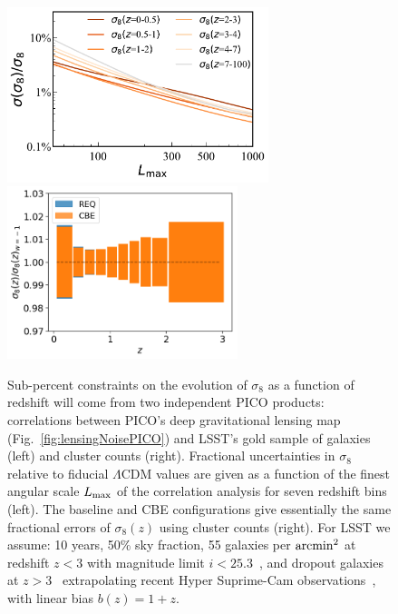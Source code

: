 \documentclass[PICOAPC.tex]{subfiles}
\begin{document}
\begin{figure}
\centering
\hspace{-0.15in}
\includegraphics[width=3in]{images/PICO_s8_lmax_PICOv4.1b_deproj0_SENS0_LSST10yrGold.pdf}
\hspace{-0.1in}
\includegraphics[width=2.65in,trim= 0cm -0.25cm 0cm 0cm]{images/PICOs8.png}
\vspace{-0.14in}
\caption{\captiontext  
Sub-percent constraints on the evolution of $\sigma_{8}$ as a function of redshift will come from two independent PICO products: correlations between PICO's deep gravitational lensing map (Fig.~\ref{fig:lensingNoisePICO}) and LSST's gold sample of galaxies (left) and cluster counts (right). Fractional uncertainties in $\sigma_{8}$ relative to fiducial $\Lambda$CDM values are given as a function of the finest angular scale $L_{\rm max}$ of the correlation analysis for seven redshift bins (left).  The baseline and CBE configurations give essentially the same fractional errors of $\sigma_{8}(z)$ using cluster counts (right).  For LSST we assume: 10 years, 50\% sky fraction, 55 galaxies per ${\rm arcmin}^{2}$ at redshift $z<3$ with magnitude limit $i <25.3$~\citep{LSSTSciBook}, and dropout galaxies at $z>3$~\citep{dropouts} extrapolating recent Hyper Suprime-Cam observations~\cite{Schmittfull/Seljak,HSC1,HSC2}, with linear bias $b(z)=1+z$.
\label{fig:sigma8} }
\vspace{-0.16in}
\end{figure}
\end{document}
